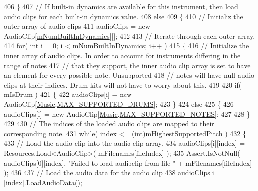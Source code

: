 \begin{DoxyCodeInclude}
406         \}
407         \textcolor{comment}{// If built-in dynamics are available for this instrument, then load audio clips for each built-in
       dynamics value.}
408         \textcolor{keywordflow}{else}
409         \{
410             \textcolor{comment}{// Initializ the outer array of audio clips}
411             audioClips = \textcolor{keyword}{new} AudioClip[\hyperlink{group___v_i_base_pro_var_gac265f64f759d267ee1e1680f8d387011}{mNumBuiltInDynamics}][];
412 
413             \textcolor{comment}{// Iterate through each outer array.}
414             \textcolor{keywordflow}{for}( \textcolor{keywordtype}{int} i = 0; i < \hyperlink{group___v_i_base_pro_var_gac265f64f759d267ee1e1680f8d387011}{mNumBuiltInDynamics}; i++ )
415             \{
416                 \textcolor{comment}{// Initialize the inner array of audio clips. In order to account for instruments differing
       in the range of notes }
417                 \textcolor{comment}{// that they support, the inner audio clip array is set to have an element for every
       possible note. Unsupported}
418                 \textcolor{comment}{// notes will have null audio clips at their indices. Drum kits will not have to worry
       about this.}
419 
420                 \textcolor{keywordflow}{if}( mIsDrum )
421                 \{
422                     audioClips[i] = \textcolor{keyword}{new} AudioClip[\hyperlink{class_music}{Music}.\hyperlink{group___music_constants_gabce1a1ac5b9b6355af6bd7fb3868467a}{MAX\_SUPPORTED\_DRUMS}];
423                 \}
424                 \textcolor{keywordflow}{else}
425                 \{
426                     audioClips[i] = \textcolor{keyword}{new} AudioClip[\hyperlink{class_music}{Music}.\hyperlink{group___music_constants_gaaf07da909a12e9fec0e43b70864f27b7}{MAX\_SUPPORTED\_NOTES}];
427 
428                 \}
429 
430                 \textcolor{comment}{// The indices of the loaded audio clips are mapped to their corresponding note. }
431                 \textcolor{keywordflow}{while}( index <= (\textcolor{keywordtype}{int})mHighestSupportedPitch )
432                 \{
433                     \textcolor{comment}{// Load the audio clip into the audio clip array.}
434                     audioClips[i][index] = Resources.Load<AudioClip>( mFilenames[fileIndex] );
435                     Assert.IsNotNull( audioClips[0][index], \textcolor{stringliteral}{"Failed to load audioclip from file "} + 
      mFilenames[fileIndex] );
436 
437                     \textcolor{comment}{// Load the audio data for the audio clip}
438                     audioClips[i][index].LoadAudioData();

\end{DoxyCodeInclude}
